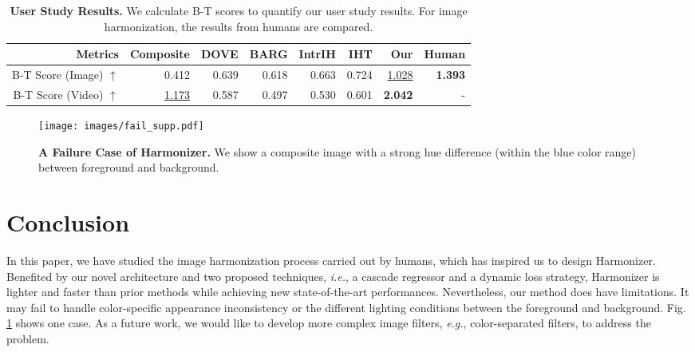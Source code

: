 \documentclass[runningheads]{llncs}
\newcommand{\ke}[1]{{\color{black}#1}}
\begin{document}
\begin{table*}[t]
  \begin{center}
    \caption{\textbf{User Study Results.} We calculate B-T scores to quantify our user study results. For image harmonization, the results from humans are compared.}\label{tab:b-t}
\setlength{\tabcolsep}{4pt}
\scriptsize
\begin{tabular}{r|rrrrr|rr}
\toprule 
      Metrics & Composite & DOVE\cite{DoveNet} & BARG\cite{BargainNet} & IntrIH\cite{IntrinsicIH} & IHT\cite{TransformerIH} & Our & Human \\
      \midrule
      B-T Score (Image) $\uparrow$ & 0.412 & 0.639 & 0.618 & 0.663 & 0.724 & \uline{1.028} & \textbf{1.393} \\
      B-T Score (Video) $\uparrow$ & \uline{1.173} & 0.587 & 0.497 & 0.530 & 0.601 & \textbf{2.042} & - \\
      \bottomrule
    \end{tabular}
\vspace{-0.5cm}
\end{center}
\end{table*}

 \begin{figure}[ht]
\centering
\vspace{-0.5cm}
\texttt{[image: images/fail\_supp.pdf]}
{\begin{center}
\vspace{-0.5cm}
\caption{\textbf{A Failure Case of Harmonizer.} We show a composite image with a strong hue difference (within the blue color range) between foreground and background.}
\label{fig:fail_visual}
\end{center}
}
\vspace{-1.5cm}
\end{figure}


\section{Conclusion}

In this paper, we have studied the image harmonization process carried out by humans, which has inspired us to design Harmonizer. Benefited by our novel architecture and two proposed techniques, {\it i.e.}, a cascade regressor and a dynamic loss strategy, Harmonizer is lighter and faster than prior methods while achieving new state-of-the-art performances. Nevertheless, our method does have limitations. \ke{It may fail to handle color-specific appearance inconsistency or the different lighting conditions between the foreground and background. Fig.\,\ref{fig:fail_visual} shows one case.} As a future work, we would like to develop more complex image filters, {\it e.g.}, color-separated filters, to address the problem.
\end{document}
